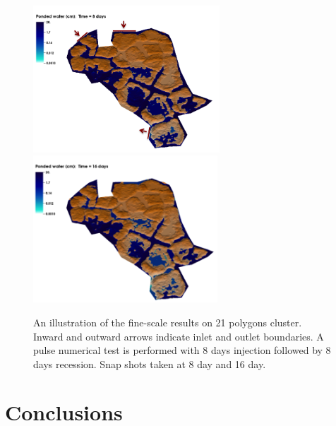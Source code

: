 \documentclass[review,11pt]{elsarticle}
\begin{document}
\begin{figure}[!h]
\centering
\includegraphics[width=6.cm, height=5.5cm]{./figures/new-model/finescale-pulsetest-8days-1.png}
\includegraphics[width=6.cm, height=5.5cm]{./figures/new-model/finescale-pulsetest-16days-1.png}
\caption{An illustration of the fine-scale results on 21 polygons cluster. Inward and outward arrows indicate inlet and outlet boundaries. A pulse numerical test is performed with 8 days injection followed by 8 days recession. Snap shots taken at 8 day and 16 day.}
\label{lobster-pulsetest}
\end{figure}

%
\section{Conclusions}\label{conclusion}
\end{document}
